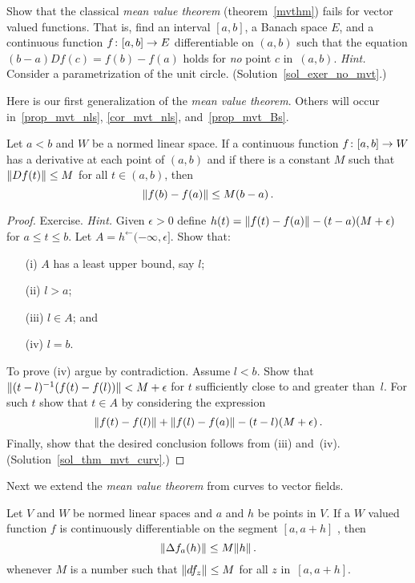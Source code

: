 \begin{exer}\label{exer_no_mvt}  Show that the classical \emph{mean value theorem}
(theorem~\ref{mvthm}) fails for vector valued functions.  That is, find an interval $[a,b]$, a
Banach space $E$, and a continuous function $f\colon [a,b] \rightarrow E$ differentiable on $(a,b)$
such that the equation $(b - a)Df(c) = f(b) - f(a)$ holds for \emph{no} point $c$ in~$(a,b)$.
\emph{Hint.} Consider a parametrization of the unit circle. (Solution~\ref{sol_exer_no_mvt}.)
\end{exer}

Here is our first generalization of the \emph{mean value theorem}.  Others will occur
in~\ref{prop_mvt_nls}, \ref{cor_mvt_nls}, and~\ref{prop_mvt_Bs}.

\begin{thm}\label{thm_mvt_curv}  Let $a < b$ and $W$ be a normed
linear space.  If a continuous function $f \colon [a,b] \rightarrow W$ has a derivative at each point
of $(a,b)$ and if there is a constant $M$ such that $\lVert Df(t)\rVert \le M$ for all $t \in
(a,b)$, then
  \[ \lVert f(b) - f(a)\rVert \le M(b - a)\,. \]
\end{thm}

\begin{proof} Exercise.  \emph{Hint.}  Given $\epsilon > 0$ define $h(t) =
\lVert f(t) - f(a)\rVert - (t - a)(M + \epsilon)$ for $a \le t \le b$.  Let $A =
h^{\gets}(-\infty,\epsilon]$.  Show that:
 \begin{enumerate}
  \item[(i)] $A$ has a least upper bound, say $l$;
  \item[(ii)] $l > a$;
  \item[(iii)] $l \in A$; and
  \item[(iv)] $l = b$.
 \end{enumerate}
To prove (iv) argue by contradiction. Assume $l < b$.  Show that $\lVert(t - l)^{-1}(f(t) -
f(l))\rVert < M + \epsilon$ for $t$ sufficiently close to and greater than~$l$.  For such $t$ show
that $t \in A$ by considering the expression
  \[ \lVert f(t)-f(l)\rVert + \lVert f(l)-f(a)\rVert - (t - l)(M + \epsilon)\, . \]
Finally, show that the desired conclusion follows from (iii) and~(iv).
(Solution~\ref{sol_thm_mvt_curv}.)   \ns
\end{proof}

Next we extend the \emph{mean value theorem} from curves to vector fields.

\begin{prop}\label{prop_mvt_nls} Let $V$ and $W$ be normed linear spaces and $a$ and $h$ be points
in $V$.  If a $W$ valued function $f$ is continuously differentiable on the segment $[a,a +
h]$ , then
  \[ \lVert\Delta f_a(h)\rVert \le M\lVert h\rVert\,. \]
whenever $M$ is a number such that $\lVert df_z\rVert \le M$ for all $z$ in~$[a,a + h]$.
\end{prop}


